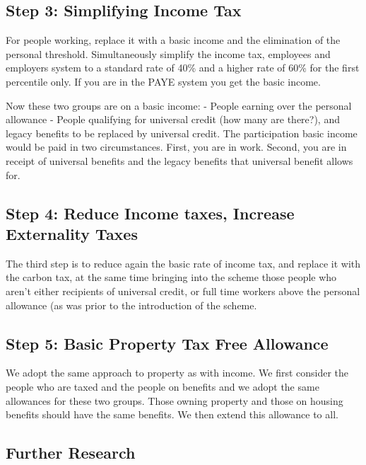\documentclass[]{tufte-handout}
\begin{document}
\hypertarget{step-3-simplifying-income-tax}{%
\subsection{Step 3: Simplifying Income
Tax}\label{step-3-simplifying-income-tax}}

For people working, replace it with a basic income and the elimination
of the personal threshold. Simultaneously simplify the income tax,
employees and employers system to a standard rate of 40\% and a higher
rate of 60\% for the first percentile only. If you are in the PAYE
system you get the basic income.

Now these two groups are on a basic income: - People earning over the
personal allowance - People qualifying for universal credit (how many
are there?), and legacy benefits to be replaced by universal credit. The
participation basic income would be paid in two circumstances. First,
you are in work. Second, you are in receipt of universal benefits and
the legacy benefits that universal benefit allows for.

\hypertarget{step-4-reduce-income-taxes-increase-externality-taxes}{%
\subsection{Step 4: Reduce Income taxes, Increase Externality
Taxes}\label{step-4-reduce-income-taxes-increase-externality-taxes}}

The third step is to reduce again the basic rate of income tax, and
replace it with the carbon tax, at the same time bringing into the
scheme those people who aren't either recipients of universal credit, or
full time workers above the personal allowance (as was prior to the
introduction of the scheme.

\hypertarget{step-5-basic-property-tax-free-allowance}{%
\subsection{Step 5: Basic Property Tax Free
Allowance}\label{step-5-basic-property-tax-free-allowance}}

We adopt the same approach to property as with income. We first consider
the people who are taxed and the people on benefits and we adopt the
same allowances for these two groups. Those owning property and those on
housing benefits should have the same benefits. We then extend this
allowance to all.

\hypertarget{further-research}{%
\subsection{Further Research}\label{further-research}}
\end{document}
